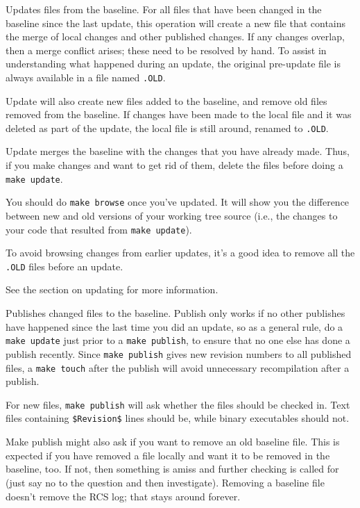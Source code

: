 \begin{description}

Updates files from the baseline.  For all files that have been
changed in the baseline since the last update, this operation will
create a new file that contains the merge of local changes and other
published changes.  If any changes overlap, then a merge conflict
arises; these need to be resolved by hand.  To assist in understanding
what happened during an update, the original pre-update file is always
available in a file named {\tt *.OLD}.

Update will also create new files added to the baseline, and remove
old files removed from the baseline.  If changes have been made to the
local file and it was deleted as part of the update, the local file is
still around, renamed to {\tt *.OLD}.

Update merges the baseline with the changes that you have already
made.  Thus, if you make changes and want to get rid of them, delete
the files before doing a {\tt make update}.

You should do {\tt make browse} once you've updated.  It will show
you the difference between new and old versions of your working tree
source (i.e., the changes to your code that resulted from {\tt make
update}).

To avoid browsing changes from earlier updates, it's a good
idea to remove all the {\tt *.OLD} files before an update.

See the section on updating for more information.

Publishes changed files to the baseline.  Publish only works if no
other publishes have happened since the last time you did an update,
so as a general rule, do a {\tt make update} just prior to a {\tt make
publish}, to ensure that no one else has done a publish recently.
Since {\tt make publish} gives new revision numbers to all published
files, a {\tt make touch} after the publish will avoid unnecessary
recompilation after a publish.

For new files, {\tt make publish} will ask whether the files should be
checked in.  Text files containing {\tt \$Revision\$} lines should be,
while binary executables should not.

Make publish might also ask if you want to remove an old baseline
file.  This is expected if you have removed a file locally and want it
to be removed in the baseline, too.  If not, then something is amiss
and further checking is called for (just say no to the question and
then investigate).  Removing a baseline file doesn't remove the RCS
log; that stays around forever.


\end{description}

